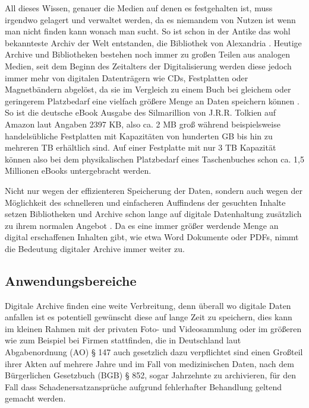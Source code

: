\documentclass[conference,compsoc,final,a4paper]{IEEEtran}
\begin{document}
All dieses Wissen, genauer die Medien auf denen es festgehalten ist, muss irgendwo gelagert und verwaltet werden, da es niemandem von Nutzen ist wenn man nicht finden kann wonach man sucht. So ist schon in der Antike das wohl bekannteste Archiv der Welt entstanden, die Bibliothek von Alexandria \autocite{BibAlexAntike}. Heutige Archive und Bibliotheken bestehen noch immer zu großen Teilen aus analogen Medien, seit dem Beginn des Zeitalters der Digitalisierung werden diese jedoch immer mehr von digitalen Datenträgern wie CDs, Festplatten oder Magnetbändern abgelöst, da sie im Vergleich zu einem Buch bei gleichem oder geringerem Platzbedarf eine vielfach größere Menge an Daten speichern können \autocite{KLA2015}. So ist die deutsche eBook Ausgabe des Silmarillion von J.R.R. Tolkien auf Amazon laut Angaben 2397 \ac{KB}, also ca. 2 \ac{MB} groß während beispielsweise handelsübliche Festplatten mit Kapazitäten von hunderten \ac{GB} bis hin zu mehreren \ac{TB} erhältlich sind. Auf einer Festplatte mit nur 3 \ac{TB} Kapazität können also bei dem physikalischen Platzbedarf eines Taschenbuches schon ca. 1,5 Millionen eBooks untergebracht werden.

Nicht nur wegen der effizienteren Speicherung der Daten, sondern auch wegen der Möglichkeit des schnelleren und einfacheren Auffindens der gesuchten Inhalte setzen Bibliotheken und Archive schon lange auf digitale Datenhaltung zusätzlich zu ihrem normalen Angebot \autocite{KLA2015}. Da es eine immer größer werdende Menge an digital erschaffenen Inhalten gibt, wie etwa Word Dokumente oder \acs{PDF}s, nimmt die Bedeutung digitaler Archive immer weiter zu.

\subsection{Anwendungsbereiche}
Digitale Archive finden eine weite Verbreitung, denn überall wo digitale Daten anfallen ist es potentiell gewünscht diese auf lange Zeit zu speichern, dies kann im kleinen Rahmen mit der privaten Foto- und Videosammlung oder im größeren wie zum Beispiel bei Firmen stattfinden, die in Deutschland laut Abgabenordnung (AO) § 147 auch gesetzlich dazu verpflichtet sind einen Großteil ihrer Akten auf mehrere Jahre und im Fall von medizinischen Daten, nach dem Bürgerlichen Gesetzbuch (BGB) § 852, sogar Jahrzehnte zu archivieren, für den Fall dass Schadenersatzansprüche aufgrund fehlerhafter Behandlung geltend gemacht werden.
\end{document}
